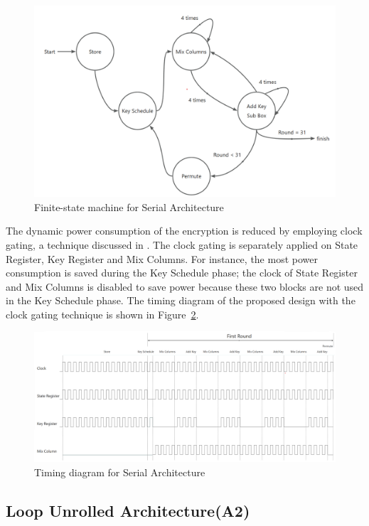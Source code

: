 \documentclass[sn-basic]{sn-jnl}%
\begin{document}
\begin{figure}[h]%
    \centering
    \includegraphics[width=\textwidth]{serial_fsm.png}
    \caption{Finite-state machine for Serial Architecture}\label{serial_fsm_fig}
\end{figure}

The dynamic power consumption of the encryption is reduced by employing clock gating, a technique discussed in \cite{shahbazi2020area}.
The clock gating is separately applied on State Register, Key Register and Mix Columns.
For instance, the most power consumption is saved during the Key Schedule phase; the clock of State Register and Mix Columns is disabled to save power because these two blocks are not used in the Key Schedule phase.
The timing diagram of the proposed design with the clock gating technique is shown in Figure~\ref{serial_time_diagrm}.

\begin{figure}[h]%
    \centering
    \includegraphics[width=\textwidth]{serial_time.png}
    \caption{Timing diagram for Serial Architecture}\label{serial_time_diagrm}
\end{figure}
\subsection{Loop Unrolled Architecture(A2)}\label{subsec3}
\end{document}
